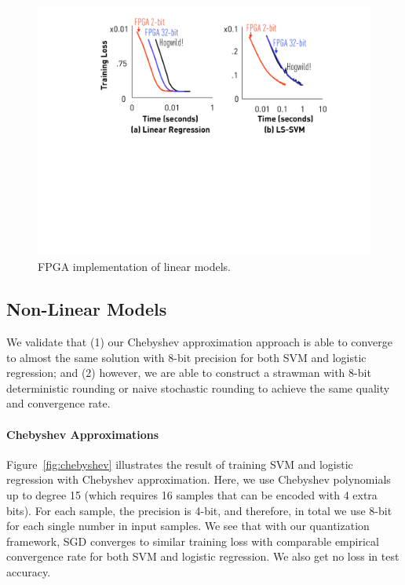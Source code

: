 \documentclass{article}
\begin{document}
\begin{figure}[t]
\centering
\includegraphics[width=0.7\columnwidth]{final-experiments/linear-fpga} 
\vspace{-1em}
\caption{FPGA implementation of linear models.}
\label{fig:speedup}
\end{figure}

\vspace{-1em}
\subsection{Non-Linear Models}
\vspace{-0.5em}

We validate that (1) our Chebyshev 
approximation approach is able to
converge to almost the same solution 
with 8-bit precision for both SVM
and logistic regression;
and (2) however, we are able to construct
a strawman with 8-bit deterministic 
rounding or naive stochastic rounding
to achieve the same quality and convergence 
rate.

\vspace{-0.5em}
\paragraph{Chebyshev Approximations}

Figure~\ref{fig:chebyshev} illustrates
the result of training SVM
and logistic regression 
with Chebyshev approximation. Here,
we use Chebyshev polynomials up to
degree 15 (which requires 16 samples
that can be encoded with 4 extra 
bits). For each sample, the precision
is 4-bit, and therefore, in total
we use 8-bit for each single number
in input samples. We see that 
with our quantization framework,
SGD converges to similar training loss 
with comparable empirical convergence 
rate for both SVM and logistic regression.
We also get no loss in test accuracy.
\end{document}
